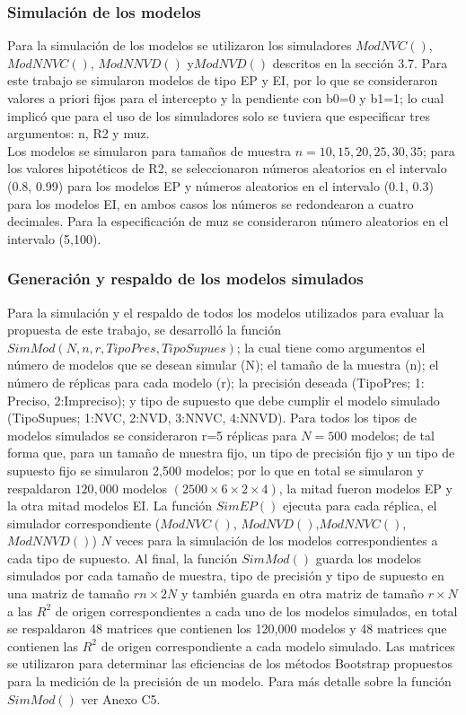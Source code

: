 \subsubsection{Simulación de los modelos}
Para la simulación de los modelos se utilizaron los simuladores $ModNVC()$, $ModNNVC()$, $ModNNVD()$ y$ ModNVD()$ descritos en la sección 3.7. Para este trabajo se simularon modelos de tipo EP y EI, por lo que se consideraron valores a priori fijos para el intercepto y la pendiente con b0=0 y b1=1; lo cual implicó que para el uso de los simuladores solo se tuviera que especificar tres argumentos: n, R2 y muz.\\

Los modelos se simularon para tamaños de muestra $n=10, 15, 20, 25, 30, 35$; para los valores hipotéticos de R2, se seleccionaron números aleatorios en el intervalo (0.8, 0.99) para los modelos EP y números aleatorios en el intervalo (0.1, 0.3) para los modelos EI, en ambos casos los números se redondearon a cuatro decimales. Para la especificación de muz se consideraron número aleatorios en el intervalo (5,100).\\
 

\subsubsection{Generación y respaldo de los modelos simulados}

Para la simulación y el respaldo de todos los modelos utilizados para evaluar la propuesta de este trabajo, se desarrolló la función $SimMod(N,n,r,TipoPres,TipoSupues)$; la cual tiene como argumentos el número de modelos que se desean simular (N); el tamaño de la muestra (n); el número de réplicas para cada modelo (r);  la precisión deseada (TipoPres; 1: Preciso, 2:Impreciso); y tipo de supuesto que debe cumplir el modelo simulado (TipoSupues; 1:NVC, 2:NVD, 3:NNVC, 4:NNVD). Para todos los tipos de modelos simulados se consideraron r=5 réplicas para $N=500$ modelos; de tal forma que, para un tamaño de muestra fijo, un tipo de precisión fijo y un tipo de supuesto fijo se simularon 2,500 modelos; por lo que en total se simularon y respaldaron $120,000$ modelos $(2500 \times 6 \times 2 \times 4)$, la mitad fueron modelos EP y la otra mitad modelos EI.
La función $SimEP()$ ejecuta para cada réplica, el simulador correspondiente ($ModNVC()$, $ModNVD()$,$ ModNNVC()$,$ ModNNVD()$) $N$ veces para la simulación de los modelos correspondientes a cada tipo de supuesto. Al final, la función $SimMod()$ guarda los modelos simulados por cada tamaño de muestra, tipo de precisión y tipo de supuesto en una matriz de tamaño $rn \times 2N$ y también guarda en otra matriz de tamaño $r \times N$ a las $R^2$ de origen correspondientes a cada uno de los modelos simulados, en total se respaldaron 48 matrices que contienen los 120,000 modelos y 48 matrices que contienen las $R^2$ de origen correspondiente a cada modelo simulado. Las matrices se utilizaron para determinar las eficiencias de los métodos Bootstrap propuestos para la medición de la precisión de un modelo. Para más detalle sobre la función $SimMod()$ ver Anexo C5.\\


